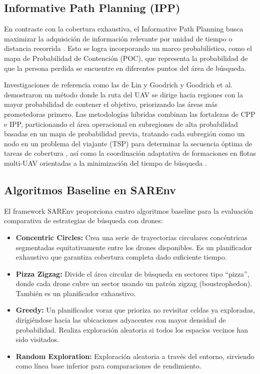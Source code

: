 \subsection{Informative Path Planning (IPP)}

En contraste con la cobertura exhaustiva, el Informative Path Planning busca maximizar la adquisición de información relevante por unidad de tiempo o distancia recorrida \cite{rossello2022, bai2021}. Esto se logra incorporando un marco probabilístico, como el mapa de Probabilidad de Contención (POC), que representa la probabilidad de que la persona perdida se encuentre en diferentes puntos del área de búsqueda.

Investigaciones de referencia como las de Lin y Goodrich \cite{lin2009} y Goodrich et al. \cite{lin2010} demostraron un método donde la ruta del UAV se dirige hacia regiones con la mayor probabilidad de contener el objetivo, priorizando las áreas más prometedoras primero. Las metodologías híbridas combinan las fortalezas de CPP e IPP, particionando el área operacional en subregiones de alta probabilidad basadas en un mapa de probabilidad previa, tratando cada subregión como un nodo en un problema del viajante (TSP) para determinar la secuencia óptima de tareas de cobertura \cite{vasquez2018}, así como la coordinación adaptativa de formaciones en flotas multi-UAV orientadas a la minimización del tiempo de búsqueda \cite{Multiple_Fixed-Wing_Unmanned_Aerial_Vehicles}.

\subsection{Algoritmos Baseline en SAREnv}

El framework SAREnv \cite{drones9090628} proporciona cuatro algoritmos baseline para la evaluación comparativa de estrategias de búsqueda con drones:

\begin{itemize}
	\item \textbf{Concentric Circles:} Crea una serie de trayectorias circulares concéntricas segmentadas equitativamente entre los drones disponibles. Es un planificador exhaustivo que garantiza cobertura completa dado suficiente tiempo.
	\item \textbf{Pizza Zigzag:} Divide el área circular de búsqueda en sectores tipo ``pizza'', donde cada drone cubre un sector usando un patrón zigzag (boustrophedon). También es un planificador exhaustivo.
	\item \textbf{Greedy:} Un planificador voraz que prioriza no revisitar celdas ya exploradas, dirigiéndose hacia las ubicaciones adyacentes con mayor densidad de probabilidad. Realiza exploración aleatoria si todos los espacios vecinos han sido visitados.
	\item \textbf{Random Exploration:} Exploración aleatoria a través del entorno, sirviendo como línea base inferior para comparaciones de rendimiento.
\end{itemize}

